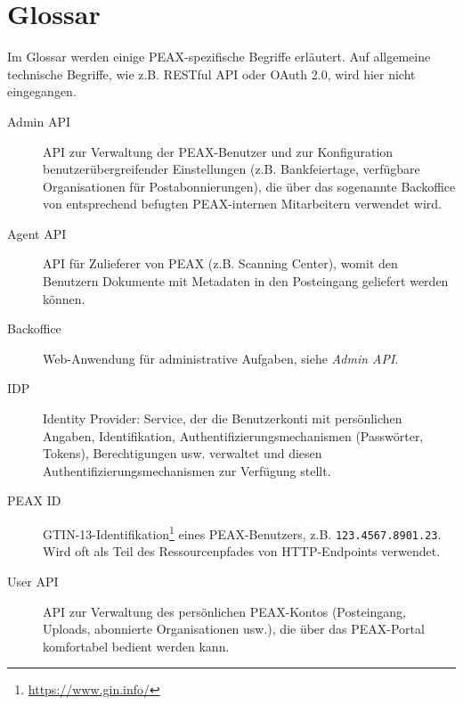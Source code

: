 \section*{Glossar}

Im Glossar werden einige PEAX-spezifische Begriffe erläutert. Auf allgemeine technische Begriffe, wie z.B. RESTful API oder OAuth 2.0, wird hier nicht eingegangen.

\begin{description}
    \item[Admin API] API zur Verwaltung der PEAX-Benutzer und zur Konfiguration benutzerübergreifender Einstellungen (z.B. Bankfeiertage, verfügbare Organisationen für Postabonnierungen), die über das sogenannte Backoffice von entsprechend befugten PEAX-internen Mitarbeitern verwendet wird.
    \item[Agent API] API für Zulieferer von PEAX (z.B. Scanning Center), womit den Benutzern Dokumente mit Metadaten in den Posteingang geliefert werden können.
    \item[Backoffice] Web-Anwendung für administrative Aufgaben, siehe \textit{Admin API}.
    \item[IDP] Identity Provider: Service, der die Benutzerkonti mit persönlichen Angaben, Identifikation, Authentifizierungsmechanismen (Passwörter, Tokens), Berechtigungen usw. verwaltet und diesen Authentifizierungsmechanismen zur Verfügung stellt.
    \item[PEAX ID] GTIN-13-Identifikation\footnote{\url{https://www.gin.info/}} eines PEAX-Benutzers, z.B. \texttt{123.4567.8901.23}. Wird oft als Teil des Ressourcenpfades von HTTP-Endpoints verwendet.
    \item[User API] API zur Verwaltung des persönlichen PEAX-Kontos (Posteingang, Uploads, abonnierte Organisationen usw.), die über das PEAX-Portal komfortabel bedient werden kann.
\end{description}

